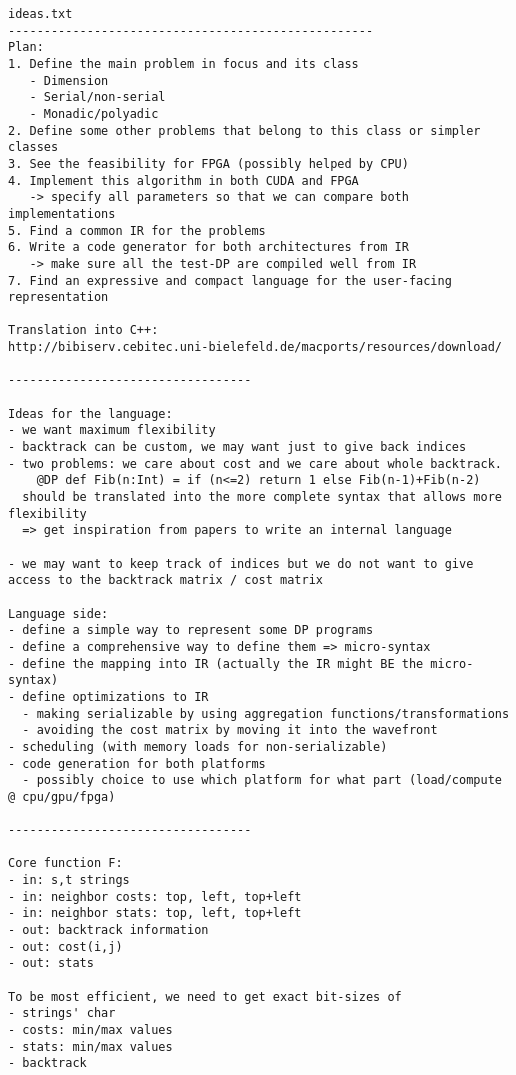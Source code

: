 \documentclass[11pt]{article}
\begin{document}
\begin{verbatim}
ideas.txt
---------------------------------------------------
Plan:
1. Define the main problem in focus and its class
   - Dimension
   - Serial/non-serial
   - Monadic/polyadic
2. Define some other problems that belong to this class or simpler classes
3. See the feasibility for FPGA (possibly helped by CPU)
4. Implement this algorithm in both CUDA and FPGA
   -> specify all parameters so that we can compare both implementations
5. Find a common IR for the problems
6. Write a code generator for both architectures from IR
   -> make sure all the test-DP are compiled well from IR
7. Find an expressive and compact language for the user-facing representation

Translation into C++:
http://bibiserv.cebitec.uni-bielefeld.de/macports/resources/download/

----------------------------------

Ideas for the language:
- we want maximum flexibility
- backtrack can be custom, we may want just to give back indices
- two problems: we care about cost and we care about whole backtrack.
	@DP def Fib(n:Int) = if (n<=2) return 1 else Fib(n-1)+Fib(n-2)
  should be translated into the more complete syntax that allows more flexibility
  => get inspiration from papers to write an internal language

- we may want to keep track of indices but we do not want to give access to the backtrack matrix / cost matrix

Language side:
- define a simple way to represent some DP programs
- define a comprehensive way to define them => micro-syntax
- define the mapping into IR (actually the IR might BE the micro-syntax)
- define optimizations to IR
  - making serializable by using aggregation functions/transformations
  - avoiding the cost matrix by moving it into the wavefront
- scheduling (with memory loads for non-serializable)
- code generation for both platforms
  - possibly choice to use which platform for what part (load/compute @ cpu/gpu/fpga)

----------------------------------

Core function F:
- in: s,t strings
- in: neighbor costs: top, left, top+left
- in: neighbor stats: top, left, top+left
- out: backtrack information
- out: cost(i,j)
- out: stats

To be most efficient, we need to get exact bit-sizes of
- strings' char
- costs: min/max values
- stats: min/max values
- backtrack


\end{verbatim}
\end{document}
